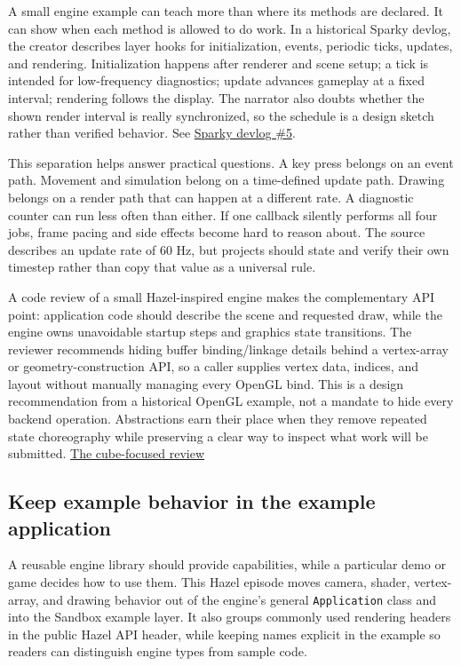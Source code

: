 A small engine example can teach more than where its methods are declared. It can show when each method is allowed to do work. In a historical Sparky devlog, the creator describes layer hooks for initialization, events, periodic ticks, updates, and rendering. Initialization happens after renderer and scene setup; a tick is intended for low-frequency diagnostics; update advances gameplay at a fixed interval; rendering follows the display. The narrator also doubts whether the shown render interval is really synchronized, so the schedule is a design sketch rather than verified behavior. See \href{https://www.youtube.com/watch?v=zqmgcQd6ayc&t=6m30s}{Sparky devlog \#5}.

This separation helps answer practical questions. A key press belongs on an event path. Movement and simulation belong on a time-defined update path. Drawing belongs on a render path that can happen at a different rate. A diagnostic counter can run less often than either. If one callback silently performs all four jobs, frame pacing and side effects become hard to reason about. The source describes an update rate of 60 Hz, but projects should state and verify their own timestep rather than copy that value as a universal rule.

A code review of a small Hazel-inspired engine makes the complementary API point: application code should describe the scene and requested draw, while the engine owns unavoidable startup steps and graphics state transitions. The reviewer recommends hiding buffer binding/linkage details behind a vertex-array or geometry-construction API, so a caller supplies vertex data, indices, and layout without manually managing every OpenGL bind. This is a design recommendation from a historical OpenGL example, not a mandate to hide every backend operation. Abstractions earn their place when they remove repeated state choreography while preserving a clear way to inspect what work will be submitted. \href{https://www.youtube.com/watch?v=sIAXLH7ZqCw&t=10m26s}{The cube-focused review}

\subsection{Keep example behavior in the example application}\label{05-engine-i-ch013-keep-example-behavior-in-the-example-application}

A reusable engine library should provide capabilities, while a particular demo or game decides how to use them. This Hazel episode moves camera, shader, vertex-array, and drawing behavior out of the engine's general \texttt{Application} class and into the Sandbox example layer. It also groups commonly used rendering headers in the public Hazel API header, while keeping names explicit in the example so readers can distinguish engine types from sample code.

